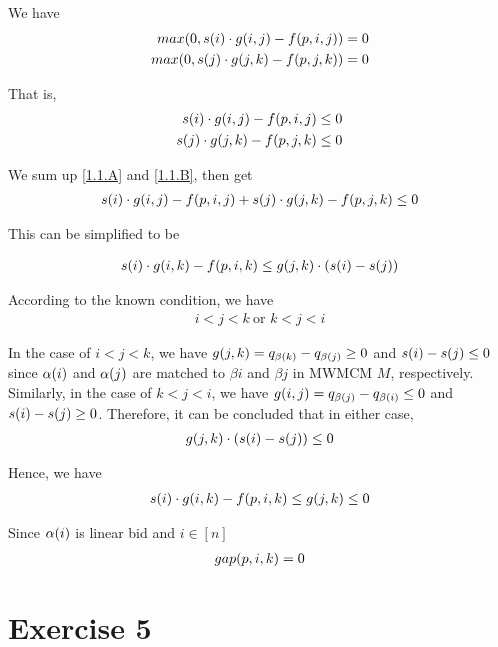 \documentclass[11pt,a4paper]{article}
\begin{document}
We have 
\begin{align}
    max(0, s(i) \cdot g(i,j) - f(p,i,j)) = 0 \\
    max(0, s(j) \cdot g(j,k) - f(p,j,k)) = 0
\end{align}

That is, 
\begin{align}
    s(i) \cdot g(i,j) - f(p,i,j) \leq 0 \label{1.1.A} \\
    s(j) \cdot g(j,k) - f(p,j,k) \leq 0 \label{1.1.B}
\end{align}

We sum up \eqref{1.1.A} and \eqref{1.1.B}, then get
\begin{align}
    s(i) \cdot g(i,j) - f(p,i,j) + s(j) \cdot g(j,k) - f(p,j,k) \leq 0 
\end{align}

This can be simplified to be 

\begin{align}
    s(i) \cdot g(i,k) - f(p,i,k) \leq  g(j,k) \cdot (s(i) - s(j))  
\end{align}

According to the known condition, we have
\begin{align}
    i < j < k \ \text{or }  k < j < i 
\end{align}

In the case of $i < j < k$, we have $g(j,k) = q_{\beta(k)} - q_{\beta(j)} \geq 0$ and 
$s(i) - s(j) \leq 0$ since $\alpha(i)$ and $\alpha(j)$ are matched to $\beta{i}$ and
$\beta{j}$ in MWMCM $M$, respectively. Similarly, in the case of $k < j < i$,
we have $g(i,j) = q_{\beta(j)} - q_{\beta(i)} \leq 0$ and $s(i) - s(j) \geq 0$.
Therefore, it can be concluded that in either case, 
\begin{align}
    g(j,k) \cdot (s(i) - s(j)) \leq 0
\end{align}

Hence, we have 
\begin{align}
    s(i) \cdot g(i,k) - f(p,i,k) \leq  g(j,k) \leq 0
\end{align}

Since $\alpha(i)$ is linear bid and $i \in [n]$
\begin{align}
    gap(p,i,k) = 0
\end{align}
\newpage

\section{Exercise 5}
\ovalbox{
\begin{minipage}{17cm}
    
\end{minipage} } \\[0.5cm]

\end{document}
